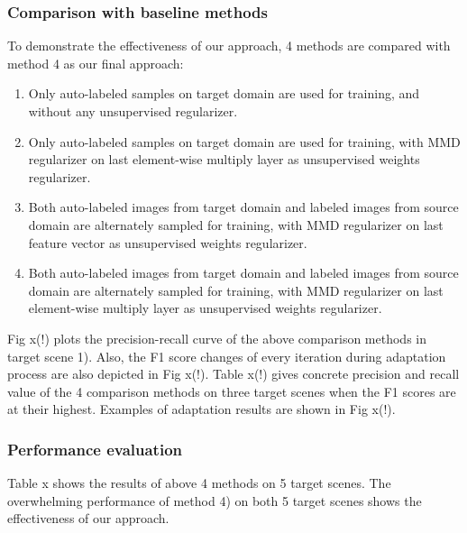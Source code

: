 \documentclass[runningheads]{llncs}
\begin{document}
\subsubsection{Comparison with baseline methods}
To demonstrate the effectiveness of our approach, 4 methods are compared with method 4 as our final approach:
\begin{enumerate}
\item Only auto-labeled samples on target domain are used for training, and without any unsupervised regularizer.
\item Only auto-labeled samples on target domain are used for training, with MMD regularizer on last element-wise multiply layer as unsupervised weights regularizer.
\item Both auto-labeled images from target domain and labeled images from source domain are alternately sampled for training, with MMD regularizer on last feature vector as unsupervised weights regularizer.
\item Both auto-labeled images from target domain and labeled images from source domain are alternately sampled for training, with MMD regularizer on last element-wise multiply layer as unsupervised weights regularizer.
\end{enumerate}
Fig x(!) plots the precision-recall curve of the above comparison methods in target scene 1). Also, the F1 score changes of every iteration during adaptation process are also depicted in Fig x(!). Table x(!) gives concrete precision and recall value of the 4 comparison methods on three target scenes when the F1 scores are at their highest. Examples of adaptation results are shown in Fig x(!).


\subsubsection{Performance evaluation}
Table x shows the results of above 4 methods on 5 target scenes. The overwhelming performance of method 4) on both 5 target scenes shows the effectiveness of our approach.
\end{document}
